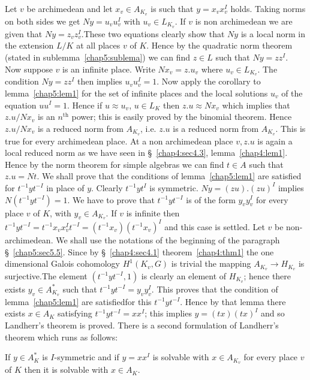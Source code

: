 \medskip
{}
Let $v$ be archimedean and let $x_v \in A_{K_v}$ is such that $y =
x_vx_v^I$ holds. Taking norms on both sides we get $Ny = u_vu_v^I$
with $u_v \in L_{K_v}$. If $v$ is non archimedean we are given that
$Ny=z_vz_v^I$.\pageoriginale These two equations clearly show that
$Ny$ is a local 
norm in the extension $L/K$ at all places $v$ of $K$. Hence by the
quadratic norm theorem (stated in sublemma~\ref{chap5:sublema}) we can find $z \in L$
such that $Ny = zz^{I}$. Now suppose $v$ is an infinite place. Write
$Nx_v = z.u_v$ where $u_v \in L_{K_v}$. The condition $Ny = zz^{I}$
then implies $u_v u_v^I = 1$. Now apply the corollary to 
lemma~\ref{chap5:lem1} for
the set of infinite places and the local solutions $u_v$ of the
equation $uu^I = 1$. Hence if $u \approx u_v$, $u \in L_K$ then $z.u
\approx Nx_v$ which implies that $z.u/Nx_v$ is an $n^{\text{th}}$
power; this is easily proved by the binomial theorem. Hence $z.u/Nx_v$
is a reduced norm from $A_{K_v}$, i.e. $z.u$ is a reduced norm from
$A_{K_v}$. This is true for every archimedean place. At a
non archimedean place $v,z.u$ is again a local reduced norm as we have
seen in \S~\ref{chap4:sec4.3}, lemma~\ref{chap4:lem1}. Hence by the
norm theorem for simple 
algebras we can find $t \in A$ such that $z.u = Nt$. We shall prove
that the conditions of lemma~\ref{chap5:lem1} are satisfied for $t^{-1}yt^{-I}$ in
place of $y$. Clearly $t^{-1}yt^I$ is symmetric. $Ny=(zu).(zu)^I$
implies $N(t^{-1}yt^{-I})=1$. We have to prove that $t^{-1}yt^{-I}$ is
of the form $y_vy_v^I$ for every place $v$ of $K$, with $y_v \in
A_{K_v}$. If $v$ is infinite then $t^{-1}yt^{-I} =
t^{-1}x_vx_v^It^{-I} = (t^{-1}x_v)(t^{-1}x_v)^I$ and this case is
settled. Let $v$ be non-archimedean. We shall use the notations of the
beginning of the paragraph \S~\ref{chap5:sec5.5}. Since by 
\S~\ref{chap4:sec4.1} theorem~\ref{chap4:thm1} the 
one dimensional Galois cohomology $H^1(K_v,G)$ is trivial the mapping
$A_{K_v}\longrightarrow H_{K_v}$ is surjective.The element
$(t^{-1}yt^{-I},1)$ is clearly an element of $H_{K_v}$; hence there
exists $y_v \in A_{K_v}^*$ such that $t^{-1}yt^{-I} = y_vy^I_v$. This
proves that the condition of lemma~\ref{chap5:lem1} 
are satisfied\pageoriginale for
this $t^{-1}yt^{-I}$. Hence by that lemma there exists $x \in A_K$ 
satisfying $t^{-1}yt^{-I} = xx^{I}$; this implies $y = (tx)(tx)^I$ and
so Landherr's theorem is proved. There is a second formulation of
Landherr's theorem which runs as follows: 

\medskip
{}
If $y \in A_K^*$ is $I$-symmetric and if $y=xx^{I}$ is solvable with
$x \in A_{K_v}$ for every place $v$ of $K$ then it is solvable with $x
\in A_K$. 

